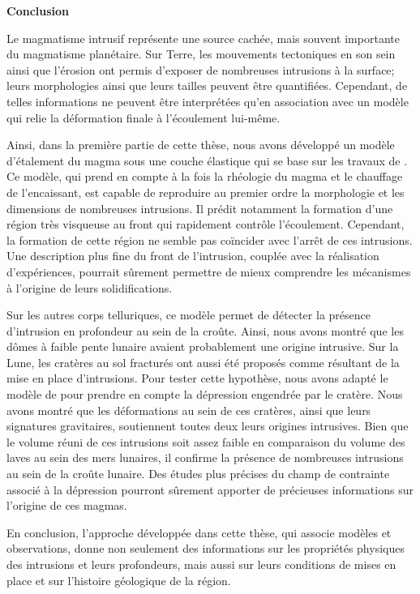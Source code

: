 \thispagestyle{plain}
\begin{center}
 \Large \vspace{.5cm} \textbf{Conclusion}
\end{center}

Le  magmatisme intrusif  représente  une source  cachée, mais  souvent
importante  du  magmatisme  planétaire.   Sur  Terre,  les  mouvements
tectoniques en  son sein ainsi  que l’érosion ont permis  d’exposer de
nombreuses intrusions à la surface; leurs morphologies ainsi que leurs
tailles peuvent être quantifiées. Cependant, de telles informations ne
peuvent être interprétées  qu’en association avec un  modèle qui relie
la déformation finale à l’écoulement lui-même.

Ainsi, dans la première partie de cette thèse, nous avons développé un
modèle d’étalement du magma sous une  couche élastique qui se base sur
les travaux de \citet{Michaut:2011kg}. Ce  modèle, qui prend en compte
à la fois  la rhéologie du magma et le  chauffage de l’encaissant, est
capable  de  reproduire  au  premier   ordre  la  morphologie  et  les
dimensions de nombreuses intrusions.  Il prédit notamment la formation
d’une  région   très  visqueuse  au  front   qui  rapidement  contrôle
l’écoulement. Cependant,  la formation de  cette région ne  semble pas
coïncider avec l’arrêt de ces intrusions. Une description plus fine du
front  de  l’intrusion,  couplée avec  la  réalisation  d’expériences,
pourrait  sûrement  permettre de  mieux  comprendre  les mécanismes  à
l’origine de leurs solidifications.

Sur  les autres  corps telluriques,  ce modèle  permet de  détecter la
présence d’intrusion en  profondeur au sein de la  croûte. Ainsi, nous
avons montré que les dômes à faible pente lunaire avaient probablement
une origine intrusive. Sur la Lune,  les cratères au sol fracturés ont
aussi   été   proposés  comme   résultant   de   la  mise   en   place
d’intrusions. Pour tester cette hypothèse, nous avons adapté le modèle
de  \citet{Michaut:2011kg}  pour  prendre   en  compte  la  dépression
engendrée par  le cratère. Nous  avons montré que les  déformations au
sein  de  ces  cratères,   ainsi  que  leurs  signatures  gravitaires,
soutiennent toutes deux leurs origines  intrusives. Bien que le volume
réuni de ces intrusions soit assez faible en comparaison du volume des
laves au sein des mers lunaires, il confirme la présence de nombreuses
intrusions au sein  de la croûte lunaire. Des études  plus précises du
champ de contrainte associé à la dépression pourront sûrement apporter
de précieuses informations sur l’origine de ces magmas.

En  conclusion, l’approche  développée dans  cette thèse,  qui associe
modèles et observations, donne non  seulement des informations sur les
propriétés physiques  des intrusions et leurs  profondeurs, mais aussi
sur leurs conditions de mises en place et sur l’histoire géologique de
la région.





